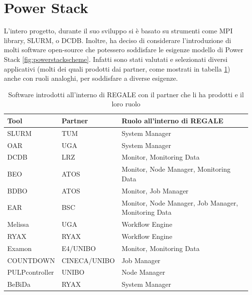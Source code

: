 \section{Power Stack}
L'intero progetto, durante il suo sviluppo si è basato su strumenti come MPI library\cite{mpi}, SLURM\cite{slurm}, o DCDB\cite{dcdb}. Inoltre, ha deciso di considerare l'introduzione di molti software open-source che potessero soddisfare le esigenze modello di Power Stack \ref{fig:powerstackscheme}. Infatti sono stati valutati e selezionati diversi applicativi (molti dei quali prodotti dai partner, come mostrati in tabella \ref{table:REGALE}) anche con ruoli analoghi, per soddisfare a diverse esigenze.
\begin{table}[ht]
    \centering
    \begin{tabular}{l|l|l}
    \hline
    \textbf{Tool} & \textbf{Partner} & \textbf{Ruolo all'interno di REGALE} \\
    \hline
    SLURM & TUM & System Manager \\
    \hline
    OAR & UGA & System Manager \\
    \hline
    DCDB & LRZ & Monitor, Monitoring Data \\
    \hline
    BEO & ATOS & Monitor, Node Manager, Monitoring Data \\
    \hline
    BDBO & ATOS & Monitor, Job Manager \\
    \hline
    EAR & BSC & Monitor, Node Manager, Job Manager, Monitoring Data \\
    \hline
    Melissa & UGA & Workflow Engine \\
    \hline
    RYAX & RYAX & Workflow Engine \\
    \hline
    Examon & E4/UNIBO & Monitor, Monitoring Data \\
    \hline
    COUNTDOWN & CINECA/UNIBO & Job Manager \\
    \hline
    PULPcontroller & UNIBO & Node Manager \\
    \hline
    BeBiDa & RYAX & System Manager \\
    \hline
\end{tabular}
\caption{Software introdotti all'interno di REGALE con il partner che li ha prodotti e il loro ruolo}\label{table:REGALE}
\end{table}

